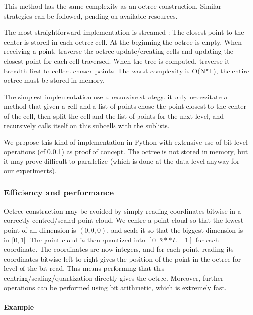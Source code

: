 			This method has the same complexity as an octree construction. Similar strategies can be followed, pending on available resources.
			
			 
			The most straightforward implementation is streamed :
			The closest point to the center is stored in each octree cell.
			At the beginning the octree is empty. When receiving a point, traverse the octree update/creating cells and updating the closest point for each cell traversed.
			When the tree is computed, traverse it breadth-first to collect chosen points.
			The worst complexity is O(N*T), the entire octree must be stored in memory.
			
			The simplest implementation use a recursive strategy. it only necessitate a method that given a cell and a list of points chose the point closest to the center of the cell, then split the cell and the list of points for the next level, and recursively calls itself on this subcells with the sublists.
			
			We propose this kind of implementation in Python with extensive use of bit-level operations (cf \ref{subsubsec:bit_coordinates}) as proof of concept.
			The octree is not stored in memory, but it may prove difficult to parallelize (which is done at the data level anyway for our experiments). 
			
			
			
		\subsubsection{Efficiency and performance}
			\label{subsubsec:bit_coordinates}
			Octree construction may be avoided by simply reading coordinates bitwise in a correctly centred/scaled point cloud.
			We centre a point cloud so that the lowest point of all dimension is $(0,0,0)$, and scale it so that the biggest dimension is in $[0,1[$.
			The point cloud is then quantized into $[0..2**L-1]$ for each coordinate.
			The coordinates are now integers, and for each point, reading its coordinates bitwise left to right gives the position of the point in the octree for level of the bit read.
			This means performing that this centring/scaling/quantization directly gives the octree. Moreover, further operations can be performed using bit arithmetic, which is extremely fast.
			
			\paragraph{Example} 
				 
